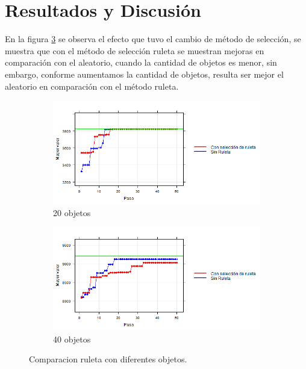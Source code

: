 \documentclass{article}
\begin{document}
\section{Resultados y Discusi\'{o}n}\label{res}

 En la figura \ref{f1} se observa el efecto que tuvo el cambio de m\'etodo de selecci\'on, se muestra que con el m\'etodo de selecci\'on ruleta se muestran mejoras en comparaci\'on con el aleatorio, cuando la cantidad de objetos es menor, sin embargo, conforme aumentamos la cantidad de objetos, resulta ser mejor el aleatorio en comparaci\'on con el m\'etodo ruleta.

\begin{figure}[H]
       \centering
       \begin{subfigure}[b]{0.85\linewidth}
           \includegraphics[width=\linewidth]{P10r20.png}
           \caption{20 objetos}
           \label{fig:westminster_lateral}
        \end{subfigure}
        \begin{subfigure}[b]{0.85\linewidth}
            \includegraphics[width=\linewidth]{P10r40.png}
            \caption{40 objetos}
            \label{fig:westminster_aerea}
        \end{subfigure}
        \caption{Comparacion ruleta con diferentes objetos.}
        \label{f1}
\end{figure}
\end{document}
